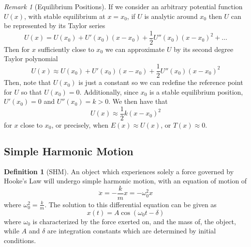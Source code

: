\documentclass[12pt]{article}
\theoremstyle{definition}
\newtheorem{defn}[thm]{Definition}
\theoremstyle{remark}
\newtheorem{rmk}[thm]{Remark}
\numberwithin{equation}{section}
\begin{document}
\begin{rmk}[Equilibrium Positions]
        If we consider an arbitrary potential function $U(x)$, with stable equilibrium at $x = x_0$, if $U$ is analytic around $x_0$ then $U$ can be represented by its Taylor series \begin{equation}
                U(x) = U(x_0) + U'(x_0)(x-x_0) + \frac{1}{2}U''(x_0)(x-x_0)^2+\hdots
        \end{equation}
        Then for $x$ sufficiently close to $x_0$ we can approximate $U$ by its second degree Taylor polynomial \begin{equation}
                U(x) \approx U(x_0) + U'(x_0)(x-x_0) + \frac{1}{2}U''(x_0)(x-x_0)^2
        \end{equation}
        Then, note that $U(x_0)$ is just a constant so we can redefine the reference point for $U$ so that $U(x_0) = 0$. Additionally, since $x_0$ is a stable equilibrium position, $U'(x_0) = 0$ and $U''(x_0) = k > 0$. We then have that \begin{equation}
                U(x) \approx \frac{1}{2}k(x-x_0)^2
        \end{equation}
        for $x$ close to $x_0$, or precisely, when $E(x) \approx U(x)$, or $T(x) \approx 0$.
\end{rmk}


\vspace{15pt}

\subsection{Simple Harmonic Motion}



\begin{defn}[SHM]
        An object which experiences solely a force governed by Hooke's Law will undergo simple harmonic motion, with an equation of motion of \begin{equation}
                \ddot{x} = -\frac{k}{m}x = -\omega_0^2x
        \end{equation}
        where $\omega_0^2 = \frac{k}{m}$. The solution to this differential equation can be given as \begin{equation}
                x(t) = A\cos(\omega_0 t - \delta)
        \end{equation}
        where $\omega_0$ is characterized by the force exerted on, and the mass of, the object, while $A$ and $\delta$ are integration constants which are determined by initial conditions.
\end{defn}
\end{document}
